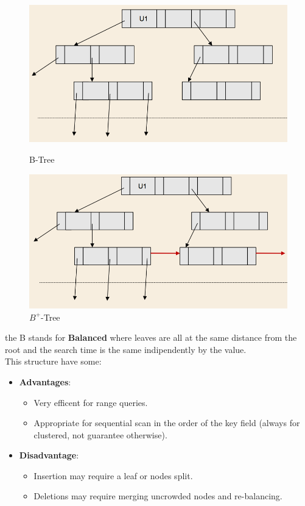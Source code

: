 \documentclass[12pt]{article}
\begin{document}
\begin{figure}[!hbpt]
  \centering
  \begin{minipage}{.45\textwidth}
    \centering
    \includegraphics[width=\linewidth]{images/b.png}
    \caption{B-Tree}
    \label{fig:b}
  \end{minipage}\hfill
  \begin{minipage}{.45\textwidth}
    \centering
    \includegraphics[width=\linewidth]{images/bplus.png}
    \caption{$B^{+}$-Tree}
    \label{fig:bplus}
  \end{minipage}\hfill
\end{figure}
the B stands for \textbf{Balanced} where leaves are all at the same distance from the root and the search time is the same indipendently by the value.\\
This structure have some:
\begin{itemize}
  \item \textbf{Advantages}:
  \begin{itemize}
    \item Very efficent for range queries.
    \item Appropriate for sequential scan in the order of the key field (always for clustered, not guarantee otherwise).
  \end{itemize}
  \item \textbf{Disadvantage}:
  \begin{itemize}
    \item Insertion may require a leaf or nodes split.
    \item Deletions may require merging uncrowded nodes and re-balancing.
  \end{itemize}
\end{itemize}
\end{document}
